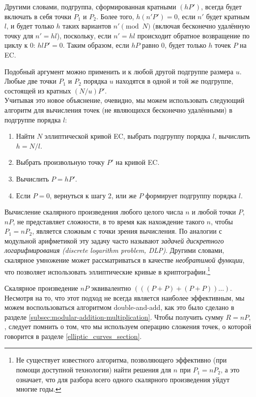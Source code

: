 Другими словами, подгруппа, сформированная кратными $(h P')$, всегда будет включать в себя точки $P_1$ и $P_2$. Более того, $h(n' P')=0$, если $n'$ будет кратным $l$, и будет только $h$ таких вариантов $n' \pmod N$ (включая бесконечно удалённую точку для $n' = hl$), поскольку, если $n' = h l$ происходит обратное возвращение по циклу к 0: $h l P' = 0$. Таким образом, если $h P$ равно 0, будет только $h$ точек $P$ на EC.

Подобный аргумент можно применить и к любой другой подгруппе размера $u$. Любые две точки $P_1$ и $P_2$ порядка $u$ находятся в одной и той же подгруппе, состоящей из кратных $(N/u) P'$.
\\ \newline
Учитывая это новое объяснение, очевидно, мы можем использовать следующий алгоритм для вычисления точек (не являющихся бесконечно удалёнными) в подгруппе порядка $l$:
\begin{enumerate}
    \item Найти $N$ эллиптической кривой EC, выбрать подгруппу порядка $l$, вычислить $h=N/l$.
    \item Выбрать произвольную точку $P'$ на кривой EC.
    \item Вычислить $P=h P'$.
    \item Если $P=0$, вернуться к шагу 2, или же $P$ формирует подгруппу порядка $l$.
\end{enumerate}

Вычисление скалярного произведения любого целого числа $n$ и любой точки $P$, $nP$, не представляет сложности, в то время как нахождение такого $n$, чтобы $P_1 = n P_2$, является сложным с точки зрения вычисления. По аналогии с модульной арифметикой эту задачу часто называют {\em задачей дискретного логарифмирования (discrete logarithm problem, DLP)}. Другими словами, скалярное умножение может рассматриваться в качестве  {\em необратимой функции}, что позволяет использовать эллиптические кривые в криптографии.\footnote{Не существует известного алгоритма, позволяющего эффективно (при помощи доступной технологии) найти решения для $n$ при $P_1 = n P_2$, а это означает, что для разбора всего одного скалярного произведения уйдут многие годы.}

Скалярное произведение $nP$ эквивалентно $(((P+P)+(P+P))…)$. Несмотря на то, что этот подход не всегда является наиболее эффективным, мы можем воспользоваться алгоритмом double-and-add, как это было сделано в разделе \ref{subsec:modular-addition-multiplication}. Чтобы получить сумму $R = n P$, , следует помнить о том, что мы используем операцию сложения точек, о которой говорится в разделе \ref{elliptic_curves_section}.


